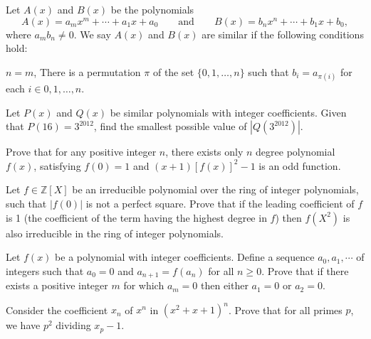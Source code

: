 \begin{question}[name={2013 Serbia TST}]
    Let $A(x)$ and $B(x)$ be the polynomials \[A(x) = a_m x^m +\cdots +a_1 x+a_0 \qquad \text{and} \qquad B(x) = b_n x^n +\cdots+b_1 x+b_0,\]
    where $a_m b_n \neq 0$. We say $A(x)$ and $B(x)$ are similar if the following conditions hold:
    \begin{tasks}
        \task $n=m$,
        \task There is a permutation $\pi$ of the set $\{ 0, 1, \dots , n\}$ such that $b_i = a_{\pi (i)}$ for each $i \in {0, 1, \dots , n}$.
    \end{tasks}
    Let $P(x)$ and $Q(x)$ be similar polynomials with integer coefficients. Given that $P(16) = 3^{2012}$, find the smallest possible value of $|Q(3^{2012})|$.
\end{question}

\begin{question}[name={2007 China TST}]
    Prove that for any positive integer $n$, there exists only $n$ degree polynomial $f(x)$, satisfying $f(0) = 1$ and $(x + 1)[f(x)]^2 - 1$ is an odd function.
\end{question}


\begin{question}[name={2003 Romania TST}]
    Let $f\in\mathbb{Z}[X]$ be an irreducible polynomial over the ring of integer polynomials, such that $|f(0)|$ is not a perfect square. Prove that if the leading coefficient of $f$ is 1 (the coefficient of the term having the highest degree in $f$) then $f(X^2)$ is also irreducible in the ring of integer polynomials.
\end{question}


\begin{question}[name={2000 Putnam}]
    Let $f(x)$ be a polynomial with integer coefficients. Define a sequence $a_0, a_1, \cdots $ of integers such that $a_0=0$ and $a_{n+1}=f(a_n)$ for all $n \ge 0$. Prove that if there exists a positive integer $m$ for which $a_m=0$ then either $a_1=0$ or $a_2=0$.
\end{question}


\begin{question}[name={Komal}]
    Consider the coefficient $x_n$ of $x^n$ in $(x^2+x+1)^n$. Prove that for all primes $p$, we have $p^2$ dividing $x_p-1$.
\end{question}

